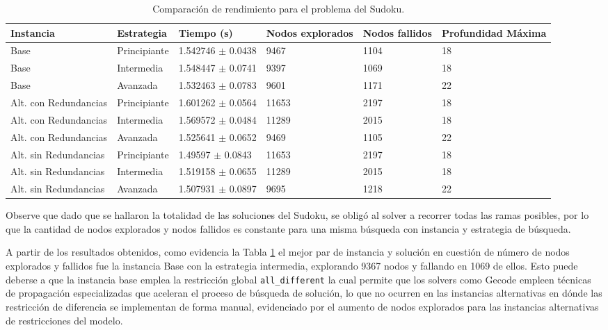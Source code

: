 \begin{table}[htbp]
    \centering
\begin{tabularx}{\textwidth}{X X X X X X}
    \toprule
    \textbf{Instancia} & \textbf{Estrategia} & \textbf{Tiempo (s)} & \textbf{Nodos explorados} & \textbf{Nodos fallidos} & \textbf{Profundidad Máxima} \\
    \midrule
    Base & Principiante & 1.542746 $\pm$ 0.0438 & 9467 & 1104 & 18 \\
    Base & Intermedia & 1.548447 $\pm$ 0.0741 & 9397 & 1069 & 18 \\
    Base & Avanzada & 1.532463 $\pm$ 0.0783 & 9601 & 1171 & 22 \\
    Alt. con Redundancias & Principiante & 1.601262 $\pm$ 0.0564 & 11653 & 2197 & 18 \\
    Alt. con Redundancias & Intermedia & 1.569572 $\pm$ 0.0484 & 11289 & 2015 & 18 \\
    Alt. con Redundancias & Avanzada & 1.525641 $\pm$ 0.0652  & 9469 & 1105 & 22 \\
    Alt. sin Redundancias & Principiante & 1.49597 $\pm$ 0.0843 & 11653 & 2197 & 18 \\
    Alt. sin Redundancias & Intermedia & 1.519158 $\pm$ 0.0655 & 11289 & 2015 & 18 \\
    Alt. sin Redundancias & Avanzada & 1.507931 $\pm$ 0.0897  & 9695 & 1218 & 22 \\
    \bottomrule
\end{tabularx}
    \caption{Comparación de rendimiento para el problema del Sudoku.}
    \label{tab:sudoku_resultados}
\end{table}

Observe que dado que se hallaron la totalidad de las soluciones del Sudoku, se obligó al solver a recorrer todas las ramas posibles, por lo que la cantidad de nodos explorados y nodos fallidos es constante para una misma búsqueda con instancia y estrategia de búsqueda.

A partir de los resultados obtenidos, como evidencia la Tabla \ref{tab:sudoku_resultados} el mejor par de instancia y solución en cuestión de número de nodos explorados y fallidos fue la instancia Base con la estrategia intermedia, explorando 9367 nodos y fallando en 1069 de ellos. Esto puede deberse a que la instancia base emplea la restricción global \verb|all_different| la cual permite que los solvers como Gecode empleen técnicas de propagación especializadas que aceleran el proceso de búsqueda de solución, lo que no ocurren en las instancias alternativas en dónde las restricción de diferencia se implementan de forma manual, evidenciado por el aumento de nodos explorados para las instancias alternativas de restricciones del modelo.\\

